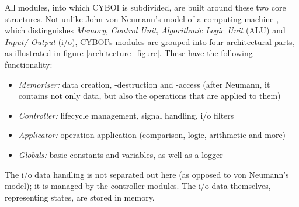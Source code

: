 All modules, into which CYBOI is subdivided, are built around these two core
structures. Not unlike John von Neumann's model of a computing machine
\cite{selflinux}, which distinguishes \emph{Memory}, \emph{Control Unit},
\emph{Algorithmic Logic Unit} (ALU) and \emph{Input/ Output} (i/o), CYBOI's
modules are grouped into four architectural parts, as illustrated in figure
\ref{architecture_figure}. These have the following functionality:

\begin{itemize}
    \item \emph{Memoriser:} data creation, -destruction and -access (after
        Neumann, it contains not only data, but also the operations that are
        applied to them)
    \item \emph{Controller:} lifecycle management, signal handling, i/o filters
    \item \emph{Applicator:} operation application (comparison, logic,
        arithmetic and more)
    \item \emph{Globals:} basic constants and variables, as well as a logger
\end{itemize}

The i/o data handling is not separated out here (as opposed to von Neumann's
model); it is managed by the controller modules. The i/o data themselves,
representing states, are stored in memory.

